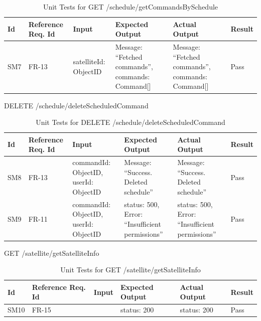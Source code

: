 \documentclass[12pt, titlepage]{article}
\begin{document}
\begin{center}
\begin{longtable}{|p{1cm} | p{2cm} |p{2cm}| p{2cm} |p{2cm}| p{2cm}|}
\caption{Unit Tests for \newline GET /schedule/getCommandsBySchedule}
\hline
\textbf{Id} & \textbf{Reference Req. Id} & \textbf{Input} & \textbf{Expected Output} & \textbf{Actual Output} & \textbf{Result} \\
\hline
SM7 & FR-13 & { satelliteId: ObjectID } & { Message: “Fetched commands”,
commands: Command[] } & { Message: “Fetched commands”,
commands: Command[] } & Pass
\\
\hline

\end{longtable}

\end{center}

DELETE /schedule/deleteScheduledCommand

\begin{center}
\begin{longtable}{|p{1cm} | p{2cm} |p{2cm}| p{2cm} |p{2cm}| p{2cm}|}
\caption{Unit Tests for \newline DELETE /schedule/deleteScheduledCommand}
\hline
\textbf{Id} & \textbf{Reference Req. Id} & \textbf{Input} & \textbf{Expected Output} & \textbf{Actual Output} & \textbf{Result} \\
\hline
SM8 & FR-13 & { commandId: ObjectID,
userId: ObjectID } & { Message: “Success. Deleted schedule” } & { Message: “Success. Deleted schedule” } & Pass
\\
\hline
SM9 & FR-11 & { commandId: ObjectID,
userId: ObjectID } & { status: 500,
Error: “Insufficient permissions” } & { status: 500,
Error: “Insufficient permissions” } & Pass
\\
\hline

\end{longtable}

\end{center}

GET /satellite/getSatelliteInfo

\begin{center}
\begin{longtable}{|p{1cm} | p{2cm} |p{2cm}| p{2cm} |p{2cm}| p{2cm}|}
\caption{Unit Tests for \newline GET /satellite/getSatelliteInfo}
\hline
\textbf{Id} & \textbf{Reference Req. Id} & \textbf{Input} & \textbf{Expected Output} & \textbf{Actual Output} & \textbf{Result} \\
\hline
SM10 & FR-15 & {  } & { status: 200 } & { status: 200 } & Pass
\\
\hline
\end{longtable}

\end{center}
\end{document}
